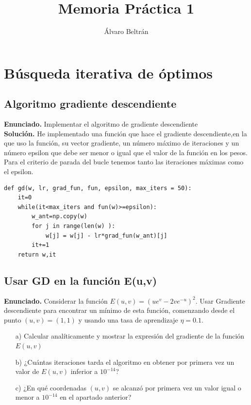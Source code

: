 \documentclass[a4paper,11pt]{article}
\title{Memoria Práctica 1}
\author{Álvaro Beltrán}
\begin{document}
\maketitle




\section{Búsqueda iterativa de óptimos}

\subsection{Algoritmo gradiente descendiente}


\textbf{Enunciado.} Implementar el algoritmo de gradiente descendiente \\
\textbf{Solución.} He implementado una función que hace el gradiente descendiente,en la que uso la función, su vector gradiente, un número máximo de iteraciones y un número epsilon que debe ser menor o igual que el valor de la función en los pesos. Para el criterio de parada del bucle tenemos tanto las iteraciones máximas como el epsilon.
\begin{lstlisting}
def gd(w, lr, grad_fun, fun, epsilon, max_iters = 50):		
    it=0
    while(it<max_iters and fun(w)>=epsilon):
        w_ant=np.copy(w)
        for j in range(len(w) ):
            w[j] = w[j] - lr*grad_fun(w_ant)[j]
        it+=1
    return w,it
\end{lstlisting}


\subsection{Usar GD en la función E(u,v)}
\textbf{Enunciado.} Considerar la función $E(u,v)= (ue^{v}-2ve^{-u})^{2}$. Usar Gradiente descendiente para encontrar un mínimo de esta función, comenzando desde el punto $(u,v)=(1,1)$ y usando una tasa de aprendizaje $\eta=0.1$.

\begin{enumerate}
\item[a)]Calcular analíticamente y mostrar la expresión del gradiente de la función $E(u,v)$
\item[b)]¿Cuántas iteraciones tarda el algoritmo en obtener por primera vez un valor de $E(u,v)$ inferior a $10^{-14}$?
\item[c)]¿En qué coordenadas $(u,v)$ se alcanzó por primera vez un valor igual o menor a $10^{-14}$ en el apartado anterior?
\end{enumerate}
\end{document}
